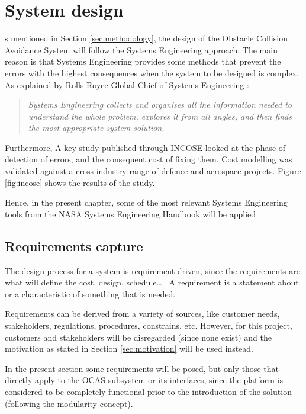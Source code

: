 
\let\textcircled=\pgftextcircled
\chapter{System design}	\label{chap:design}

s mentioned in Section \ref{sec:methodology}, the design of the Obstacle Collision Avoidance System will follow the Systems Engineering approach.
The main reason is that Systems Engineering provides some methods that prevent the errors with the highest consequences when the system to be designed is complex.
As explained by Rolls-Royce Global Chief of Systems Engineering \cite{beasley2015}:
\begin{quote}
	\itshape
	Systems Engineering collects and organises all the information needed to understand the whole problem, explores it from all angles, and then finds the most appropriate system solution.
\end{quote}

Furthermore, A key study published through INCOSE \cite{incoseuk2016} looked at the phase of detection of errors, and the consequent cost of fixing them.
Cost modelling was validated against a cross-industry range of defence and aerospace projects.
Figure \ref{fig:incose} shows the results of the study.



Hence, in the present chapter, some of the most relevant Systems Engineering tools from the NASA Systems Engineering Handbook \cite{nationalaeronauticsandspaceadministration2007} will be applied


\section{Requirements capture} \label{sec:sysReqs}

The design process for a system is requirement driven, since the requirements are what will define the cost, design, schedule\ldots\ %
A requirement is a statement about or a characteristic of something that is needed.

Requirements can be derived from a variety of sources, like customer needs, stakeholders, regulations, procedures, constrains, etc.
However, for this project, customers and stakeholders will be disregarded (since none exist) and the motivation as stated in Section \ref{sec:motivation} will be used instead.

In the present section some requirements will be posed, but only those that directly apply to the OCAS subsystem or its interfaces, since the platform is considered to be completely functional prior to the introduction of the solution (following the modularity concept).


